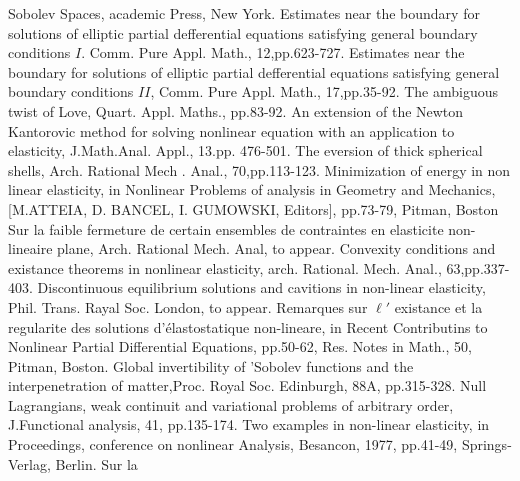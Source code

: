 \begin{thebibliography}{99}\pageoriginale
{} Sobolev Spaces, academic Press, New York.
 Estimates
  near the boundary for solutions of elliptic partial defferential
  equations satisfying general boundary conditions $I$. Comm. Pure
  Appl. Math., 12,pp.623-727. 
 Estimates
  near the boundary for solutions of elliptic partial defferential
  equations satisfying general boundary conditions $II$, Comm. Pure
  Appl. Math., 17,pp.35-92. 
 The ambiguous
  twist of Love, Quart. Appl. Maths., pp.83-92. 
 An extension of the
  Newton Kantorovic method for solving nonlinear equation with an
  application to elasticity, J.Math.Anal. Appl., 13.pp. 476-501. 
 The eversion of thick spherical
  shells, Arch. Rational Mech . Anal., 70,pp.113-123. 
 Minimization of energy
  in non linear elasticity, in Nonlinear Problems of analysis in
  Geometry and Mechanics, [M.ATTEIA, D. BANCEL, I. GUMOWSKI, Editors],
  pp.73-79, Pitman, Boston 
 Sur la faible fermeture
  de certain ensembles de contraintes en elasticite non-lineaire
  plane, Arch. Rational Mech. Anal, to appear. 
\pageoriginale Convexity conditions and existance
  theorems in nonlinear elasticity, arch. Rational. Mech. Anal.,
  63,pp.337-403. 
 Discontinuous equilibrium solutions
  and cavitions in non-linear elasticity, Phil. Trans. Rayal
  Soc. London, to appear. 
 Remarques sur $\ell'$ existance et la
  regularite des solutions d'\'elastostatique non-lineare, in Recent
  Contributins to Nonlinear Partial Differential Equations,
  pp.50-62, Res. Notes in Math., 50, Pitman, Boston. 
 Global invertibility of 'Sobolev
  functions and the interpenetration of matter,Proc. Royal
  Soc. Edinburgh, 88A, pp.315-328. 
 Null
  Lagrangians, weak continuit and variational problems of arbitrary
  order, J.Functional analysis, 41, pp.135-174.  
 Two
  examples in non-linear elasticity, in Proceedings, conference on
  nonlinear Analysis, Besancon, 1977, pp.41-49, Springs-Verlag,
  Berlin. 
 Sur la

\end{thebibliography}

